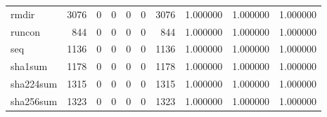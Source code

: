 \begin{tabular}{lrrrrrrrrr}
rmdir     &                                3076 &                                               0 &                                              0 &                                             0 &                                              0 &                                         3076 &                                           1.000000 &                               1.000000 &                             1.000000 \\
runcon    &                                 844 &                                               0 &                                              0 &                                             0 &                                              0 &                                          844 &                                           1.000000 &                               1.000000 &                             1.000000 \\
seq       &                                1136 &                                               0 &                                              0 &                                             0 &                                              0 &                                         1136 &                                           1.000000 &                               1.000000 &                             1.000000 \\
sha1sum   &                                1178 &                                               0 &                                              0 &                                             0 &                                              0 &                                         1178 &                                           1.000000 &                               1.000000 &                             1.000000 \\
sha224sum &                                1315 &                                               0 &                                              0 &                                             0 &                                              0 &                                         1315 &                                           1.000000 &                               1.000000 &                             1.000000 \\
sha256sum &                                1323 &                                               0 &                                              0 &                                             0 &                                              0 &                                         1323 &                                           1.000000 &                               1.000000 &                             1.000000 \\

\end{tabular}
